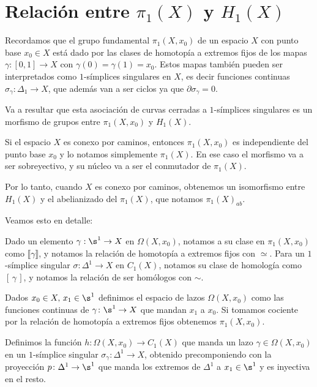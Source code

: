 \section{Relación entre $\pi_1(X)$ y $H_1(X)$}

Recordamos que el grupo fundamental $\pi_1(X,x_0)$ de un espacio $X$ con punto base $x_0\in X$ está dado por las clases de homotopía a extremos fijos de los mapas $\gamma:[0,1]\to X$ con $\gamma(0)=\gamma(1)=x_0$. Estos mapas también pueden ser interpretados como $1$-símplices singulares en $X$, es decir funciones continuas $\sigma_\gamma:\Delta_1\to X$, que además van a ser ciclos ya que $\partial \sigma_\gamma=0$.

Va a resultar que esta asociación de curvas cerradas a $1$-símplices singulares es un morfismo de grupos entre $\pi_1(X,x_0)$ y $H_1(X)$. 

Si el espacio $X$ es conexo por caminos, entonces $\pi_1(X,x_0)$ es independiente del punto base $x_0$ y lo notamos simplemente $\pi_1(X)$. En ese caso el morfismo va a ser sobreyectivo, y su núcleo va a ser el conmutador de $\pi_1(X)$. 

Por lo tanto, cuando $X$ es conexo por caminos, obtenemos un isomorfismo entre $H_1(X)$ y el abelianizado del $\pi_1(X)$, que notamos $\pi_1(X)_{ab}$. 

Veamos esto en detalle:

Dado un elemento $\gamma:\s^1\to X$ en $\Omega(X,x_0)$, notamos a su clase en $\pi_1(X,x_0)$ como $\llbracket\gamma\rrbracket$, y notamos la relación de homotopía a extremos fijos con $\simeq$. Para un $1$-símplice singular $\sigma:\Delta^1\to X$ en $C_1(X)$, notamos su clase de homología como $[\,\gamma\,]$, y notamos la relación de ser homólogos con $\sim$.


Dados $x_0\in X,\, x_1\in\s^1$ definimos el espacio de lazos $\Omega(X,x_0)$ como las funciones continuas de $\gamma\colon\s^1\to X$ que mandan $x_1$ a $x_0$. Si tomamos cociente por la relación de homotopía a extremos fijos obtenemos $\pi_1(X,x_0)$.

Definimos la función $h\colon\Omega(X,x_0)\to C_1(X)$ que manda un lazo $\gamma\in\Omega(X,x_0)$ en un $1$-símplice singular $\sigma_\gamma:\Delta^1\to X$, obtenido precomponiendo con la proyección $p\colon\Delta^1\to\s^1$ que manda los extremos de $\Delta^1$ a $x_1\in\s^1$ y es inyectiva en el resto. 

